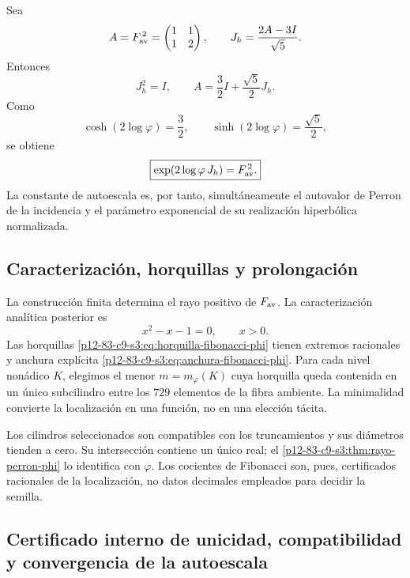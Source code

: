 Sea
\[
 A=F_{\rm av}^{\,2}=
 \begin{pmatrix}1&1\\1&2\end{pmatrix},
 \qquad
 J_h=\frac{2A-3I}{\sqrt5}.
\]
Entonces
\[
 J_h^2=I,
 \qquad
 A=\frac32I+\frac{\sqrt5}{2}J_h.
\]
Como
\[
 \cosh(2\log\varphi)=\frac32,
 \qquad
 \sinh(2\log\varphi)=\frac{\sqrt5}{2},
\]
se obtiene
\begin{equation}
 \boxed{
 \exp(2\log\varphi\,J_h)=F_{\rm av}^{\,2}.}
 \label{p12-83-c9-s3:eq:realizacion-hiperbolica-phi}
\end{equation}
La constante de autoescala es, por tanto, simultáneamente el autovalor de
Perron de la incidencia y el parámetro exponencial de su realización
hiperbólica normalizada.

\subsection{Caracterización, horquillas y prolongación}

La construcción finita determina el rayo positivo de \(F_{\rm av}\). La
caracterización analítica posterior es
\[
 x^2-x-1=0,
 \qquad x>0.
\]
Las horquillas \eqref{p12-83-c9-s3:eq:horquilla-fibonacci-phi} tienen extremos racionales
y anchura explícita \eqref{p12-83-c9-s3:eq:anchura-fibonacci-phi}. Para cada nivel
nonádico \(K\), elegimos el menor \(m=m_{\varphi}(K)\) cuya horquilla queda
contenida en un único subcilindro entre los \(729\) elementos de la fibra
ambiente. La minimalidad convierte la localización en una función, no en una
elección tácita.

Los cilindros seleccionados son compatibles con los truncamientos y sus
diámetros tienden a cero. Su intersección contiene un único real; el
\cref{p12-83-c9-s3:thm:rayo-perron-phi} lo identifica con \(\varphi\). Los cocientes de
Fibonacci son, pues, certificados racionales de la localización, no datos
decimales empleados para decidir la semilla.

\subsection{Certificado interno de unicidad, compatibilidad y convergencia de la autoescala}

